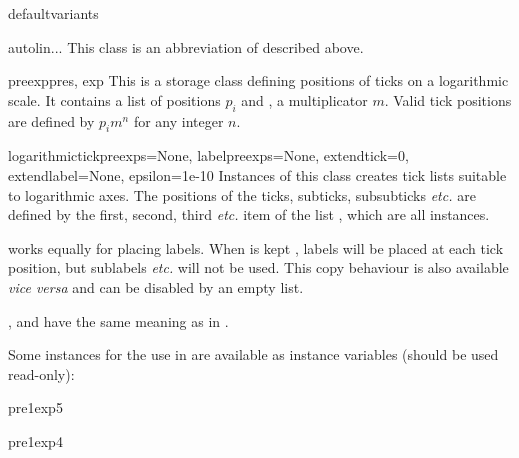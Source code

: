 \begin{memberdesc}{defaultvariants}
\end{memberdesc}

\begin{classdesc}{autolin}{...}
This class is an abbreviation of  described above.
\end{classdesc}

\begin{classdesc}{preexp}{pres, exp}
  This is a storage class defining positions of ticks on a
  logarithmic scale. It contains a list  of positions $p_i$
  and , a multiplicator $m$. Valid tick positions are defined
  by $p_im^n$ for any integer $n$.
\end{classdesc}

\begin{classdesc}{logarithmic}{tickpreexps=None, labelpreexps=None,
                               extendtick=0, extendlabel=None,
                               epsilon=1e-10}
  Instances of this class creates tick lists suitable to logarithmic
  axes. The positions of the ticks, subticks, subsubticks \emph{etc.}
  are defined by the first, second, third \emph{etc.} item of the list
  , which are all  instances.

   works equally for placing labels. When 
  is kept , labels will be placed at each tick position,
  but sublabels \emph{etc.} will not be used. This copy behaviour is
  also available \emph{vice versa} and can be disabled by an empty
  list.

  ,  and  have the same
  meaning as in .
\end{classdesc}

Some  instances for the use in  are
available as instance variables (should be used read-only):

\begin{memberdesc}{pre1exp5}
\end{memberdesc}

\begin{memberdesc}{pre1exp4}
\end{memberdesc}


